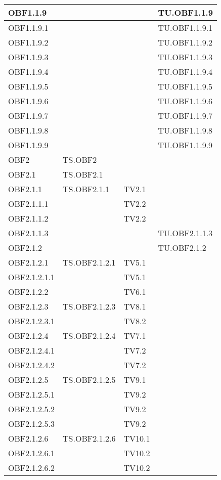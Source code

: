 \documentclass{scalatekids-article}
\begin{document}
\begin{longtable}[H]{|l|p{4cm}|p{4cm}|p{4cm}|}
  \hline
  OBF1.1.9 &  & & TU.OBF1.1.9 \\
  \hline
  OBF1.1.9.1 &  & & TU.OBF1.1.9.1 \\
  \hline
  OBF1.1.9.2 &  & & TU.OBF1.1.9.2 \\
  \hline
  OBF1.1.9.3 &  & & TU.OBF1.1.9.3 \\
  \hline
  OBF1.1.9.4 &  & & TU.OBF1.1.9.4 \\
  \hline
  OBF1.1.9.5 &  & & TU.OBF1.1.9.5 \\
  \hline
  OBF1.1.9.6 &  & & TU.OBF1.1.9.6 \\
  \hline
  OBF1.1.9.7 &  & & TU.OBF1.1.9.7 \\
  \hline
  OBF1.1.9.8 &  & & TU.OBF1.1.9.8  \\
  \hline
  OBF1.1.9.9 &  & & TU.OBF1.1.9.9 \\
  \hline
  OBF2 & TS.OBF2 &  &\\
  \hline
  OBF2.1 & TS.OBF2.1 & &\\
  \hline
  OBF2.1.1 & TS.OBF2.1.1 & TV2.1 &\\
  \hline
  OBF2.1.1.1 & & TV2.2 &\\
  \hline
  OBF2.1.1.2 & & TV2.2 &\\
  \hline
  OBF2.1.1.3 & & & TU.OBF2.1.1.3  \\
  \hline
  OBF2.1.2 & &  & TU.OBF2.1.2 \\
  \hline
  OBF2.1.2.1 & TS.OBF2.1.2.1 & TV5.1 &\\
  \hline
  OBF2.1.2.1.1 & & TV5.1 &\\
  \hline
  OBF2.1.2.2 & & TV6.1 &\\
  \hline
  OBF2.1.2.3 & TS.OBF2.1.2.3 & TV8.1 &\\
  \hline
  OBF2.1.2.3.1 & & TV8.2 &\\
  \hline
  OBF2.1.2.4 & TS.OBF2.1.2.4 & TV7.1 &\\
  \hline
  OBF2.1.2.4.1 & & TV7.2 &\\
  \hline
  OBF2.1.2.4.2 & & TV7.2 &\\
  \hline
  OBF2.1.2.5 & TS.OBF2.1.2.5 & TV9.1 &\\
  \hline
  OBF2.1.2.5.1 & & TV9.2 &\\
  \hline
  OBF2.1.2.5.2 & & TV9.2 &\\
  \hline
  OBF2.1.2.5.3 & & TV9.2 &\\
  \hline
  OBF2.1.2.6 & TS.OBF2.1.2.6 & TV10.1 &\\
  \hline
  OBF2.1.2.6.1 & & TV10.2 &\\
  \hline
  OBF2.1.2.6.2 & & TV10.2 &\\

\end{longtable}
\end{document}
